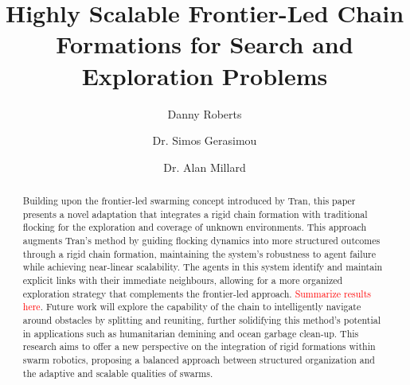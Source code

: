 \documentclass[runningheads]{llncs}
\newcommand\incomplete[1]{\textcolor{red}{#1}}
\begin{document}
%
\title{Highly Scalable Frontier-Led Chain Formations for Search and Exploration Problems}
%
%
\author{Danny Roberts \and
Dr. Simos Gerasimou \and
Dr. Alan Millard}


\maketitle 
%
\begin{abstract}
Building upon the frontier-led swarming concept introduced by Tran\cite{tran2022}, this paper presents a novel adaptation that integrates a rigid chain formation with traditional flocking for the exploration and coverage of unknown environments. This approach augments Tran's method by guiding flocking dynamics into more structured outcomes through a rigid chain formation, maintaining the system's robustness to agent failure while achieving near-linear scalability. The agents in this system identify and maintain explicit links with their immediate neighbours, allowing for a more organized exploration strategy that complements the frontier-led approach. \incomplete{Summarize results here}. Future work will explore the capability of the chain to intelligently navigate around obstacles by splitting and reuniting, further solidifying this method's potential in applications such as humanitarian demining and ocean garbage clean-up. This research aims to offer a new perspective on the integration of rigid formations within swarm robotics, proposing a balanced approach between structured organization and the adaptive and scalable qualities of swarms.

\end{abstract}
\end{document}
